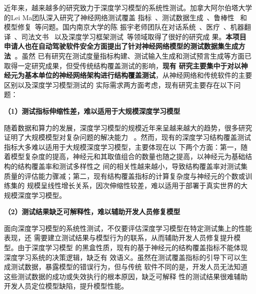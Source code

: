 



近年来，越来越多的研究致力于深度学习模型的系统性测试。加拿大阿尔伯塔大学的Lei Ma团队深入研究了神经网络测试覆盖
指标~\cite{ma2018deepgauge,ma2019deepct}、测试数据生成~\cite{xie2019coverage,xie2019deephunter}、鲁棒性
~\cite{wang2020deepsonar,sun2020stealthy,zhang2020generating}和模型修复~\cite{yu2021deeprepair}等问题。国内南京大学的陈
振宇老师团队在对话系统~\cite{liu2021dialtest}、医疗~\cite{hou2021taumed}、机器翻译~\cite{ji2021automated}、司法文书
~\cite{guo2020taujud}以及深度学习框架测试~\cite{zhang2021duo,zhang2021predoo,luo2021graph}等领域取得了很好的研究成
果。\textbf{本项目申请人也在自动驾驶软件安全方面提出了针对神经网络模型的测试数据集生成方法~\cite{xu2021deepsuite}}。虽然
已有研究在测试度量指标构建、测试输入生成和测试预言生成等方面已取得一定研究成果，但受传统结构覆盖测试的影响，\textbf{现有
    研究主要集中于对以神经元为基本单位的神经网络架构进行结构覆盖测试}，从神经网络和传统软件的主要区别以及深度学习模型测试的
实际需求两方面考虑，现有研究主要存在以下问题：

\textbf{（1）测试指标伸缩性差，难以适用于大规模深度学习模型}

随着数据和算力的发展，深度学习模型的规模近年来呈越来越大的趋势，很多研究证明了大规模模型对复杂问题的解决能力
~\cite{kenton2019bert,he2021masked}。然而，现有的深度学习结构覆盖测试指标大多难以适用于大规模深度学习模型，主要体现在以
下两个方面：第一，随着模型复杂度的提高，神经元和其取值组合的数量也随之提高，以神经元为基础结构的结构覆盖率和测试多样性之
间的相关性越来越小，导致结构覆盖率对测试集质量的评估能力骤减；第二，现有结构覆盖指标的计算复杂度与神经元的个数或训练集的
规模呈线性增长关系，因次伸缩性较差，难以适用于部署于真实世界的大规模深度学习模型。


\textbf{（2）测试结果缺乏可解释性，难以辅助开发人员修复模型}

面向深度学习模型的系统性测试，不仅要评估深度学习模型在特定测试集上的性能表现，还
需要建立测试结果与模型行为的联系，从而辅助开发人员修复提升模型。由于深度学习模型
的黑盒性质，现有的基于神经元的结构覆盖指标不能体现深度学习系统的决策逻辑，缺乏有
效语义。虽然在测试覆盖指标的引导下可以生成测试数据，暴露模型的错误行为，但与传统
软件不同的是，开发人员无法知道这些测试数据的成功或失效执行的根本原因，缺乏可解释
性的测试结果很难辅助开发人员定位模型缺陷，提升模型性能。

